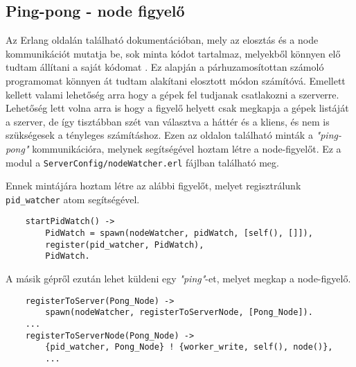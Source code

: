 \subsection{Ping-pong - node figyelő \label{subsec:nodewatcher}}
	Az Erlang oldalán található dokumentációban, mely az elosztás és a node kommunikációt mutatja be, sok minta kódot tartalmaz, melyekből könnyen elő tudtam állítani a saját kódomat \cite{pingpong}.\newline
	Ez alapján a párhuzamosítottan számoló programomat könnyen át tudtam alakítani elosztott módon számítóvá. \newline 
	Emellett kellett valami lehetőség arra hogy a gépek fel tudjanak csatlakozni a szerverre. Lehetőség lett volna arra is hogy a figyelő helyett csak megkapja a gépek listáját a szerver, de így tisztábban szét van választva a háttér és a kliens, és nem is szükségesek a tényleges számításhoz. \newline
	Ezen az oldalon található minták a \textit{"ping-pong"} kommunikációra, melynek segítségével hoztam létre a node-figyelőt. Ez a modul a \texttt{ServerConfig/nodeWatcher.erl} fájlban található meg. \newline

	Ennek mintájára hoztam létre az alábbi figyelőt, melyet regisztrálunk \texttt{pid\_watcher} atom segítségével. 
	\begin{verbatim}
	startPidWatch() ->
	    PidWatch = spawn(nodeWatcher, pidWatch, [self(), []]),
	    register(pid_watcher, PidWatch),
	    PidWatch.
	\end{verbatim}

	A másik gépről ezután lehet küldeni egy \textit{"ping"}-et, melyet megkap a node-figyelő.
	\begin{verbatim}
	registerToServer(Pong_Node) ->
	    spawn(nodeWatcher, registerToServerNode, [Pong_Node]).
	...
	registerToServerNode(Pong_Node) -> 
	    {pid_watcher, Pong_Node} ! {worker_write, self(), node()},
	    ...
	\end{verbatim}


